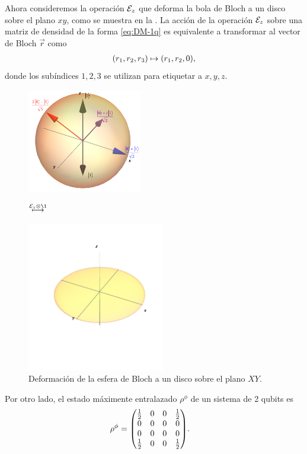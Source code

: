 Ahora consideremos la operación $\mathcal{E}_z$ que deforma la bola de Bloch a un 
disco sobre el plano $xy$, como se muestra en la . 
La acción de la operación $\mathcal{E}_z$ sobre una matriz de densidad
de la forma \eqref{eq:DM-1q} es equivalente a 
transformar al vector de Bloch $\vec{r}$ como 
\begin{align}
\qty(r_1,r_2,r_3)\mapsto\qty(r_1,r_2,0),
\label{eq:notCP}
\end{align}
donde los subíndices $1,2,3$ se utilizan para etiquetar a $x,y,z$.
\begin{figure}[H]
\centering
\begin{minipage}{.4\textwidth}
\centering
\includegraphics[width=5cm]
{img-congreso/bloch.png}
\end{minipage}
$\stackrel{\E_{z}\otimes\1 \vspace{1cm}}{\longmapsto}$
\begin{minipage}{0.4\textwidth}
\centering
\includegraphics[width=6cm]
{img-congreso/DiskXY}
\end{minipage}
\caption{Deformación de la esfera de Bloch a un disco sobre el plano $XY$.}
\label{fig:qtm-op-motivation}
\end{figure}
Por otro lado, el estado máximente entralazado $\rho^{\phi}$ de 
un sistema de 2 qubits es \cite{bengtsson_zyczkowski_2017}
\begin{align}
\rho^{\phi}&=
\mqty( 
\frac{1}{2} & 0 & 0 & \frac{1}{2} \\
0 & 0 & 0 & 0 \\
0 & 0 & 0 & 0 \\
\frac{1}{2} & 0 & 0 & \frac{1}{2} \\
).
\label{eq:DM-2q-MaxE}
\end{align}
